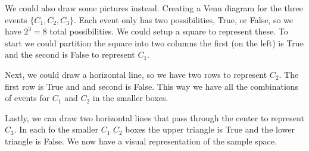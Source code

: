 We could also draw some pictures instead. Creating a Venn diagram for the three events $\{C_{1}, C_{2}, C_{3}\}$. Each event only has two possibilities, True, or False, so we have $2^{3} = 8$ total possibilities. We could setup a square to represent these. To start we could partition the square into two columns the first (on the left) is True and the second is False to represent $C_{1}$.



Next, we could draw a horizontal line, so we have two rows to represent $C_{2}$. The first row is True and and second is False. This way we have all the combinations of events for $C_{1}$ and $C_{2}$ in the smaller boxes.


Lastly, we can draw two horizontal lines that pass through the center to represent $C_{3}$. In each fo the smaller $C_{1}$ $C_{2}$ boxes the upper triangle is True and the lower triangle is False. We now have a visual representation of the sample space.

